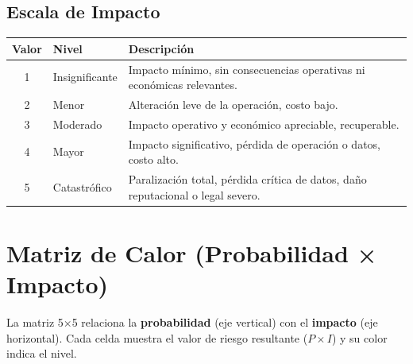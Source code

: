 \documentclass[11pt,a4paper]{article}
\begin{document}
\subsection{Escala de Impacto}

\begin{center}
\renewcommand{\arraystretch}{1.4}
\begin{tabularx}{\textwidth}{@{} c p{2.8cm} X @{}}
\toprule
\textbf{Valor} & \textbf{Nivel} & \textbf{Descripción} \\
\midrule
1 & Insignificante & Impacto mínimo, sin consecuencias operativas ni económicas relevantes. \\
\midrule
2 & Menor & Alteración leve de la operación, costo bajo. \\
\midrule
3 & Moderado & Impacto operativo y económico apreciable, recuperable. \\
\midrule
4 & Mayor & Impacto significativo, pérdida de operación o datos, costo alto. \\
\midrule
5 & Catastrófico & Paralización total, pérdida crítica de datos, daño reputacional o legal severo. \\
\bottomrule
\end{tabularx}
\end{center}

\section{Matriz de Calor (Probabilidad × Impacto)}

La matriz 5×5 relaciona la \textbf{probabilidad} (eje vertical) con el \textbf{impacto} (eje horizontal). Cada celda muestra el valor de riesgo resultante (\(P \times I\)) y su color indica el nivel.
\end{document}
